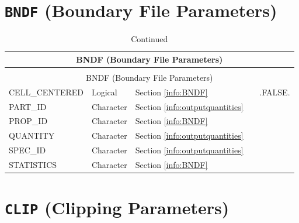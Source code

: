 \documentclass[11pt]{book}
\begin{document}
\clearpage


\section{\texorpdfstring{{\tt BNDF}}{BNDF} (Boundary File Parameters)}

\begin{longtable}{@{\extracolsep{\fill}}|l|l|l|l|l|}
\caption[Boundary file parameters ({\ct BNDF} namelist group)]{For more information see Section~\ref{info:BNDF}.}
\label{tbl:BNDF} \\
\hline
\multicolumn{5}{|c|}{{\ct BNDF} (Boundary File Parameters)} \\
\hline \hline
\endfirsthead
\caption[]{Continued} \\
\hline
\multicolumn{5}{|c|}{{\ct BNDF} (Boundary File Parameters)} \\
\hline \hline
\endhead
{\ct CELL\_CENTERED}    & Logical     & Section \ref{info:BNDF}                 &           & {\ct .FALSE.}   \\ \hline
{\ct PART\_ID}          & Character   & Section \ref{info:outputquantities}     &           &                 \\ \hline
{\ct PROP\_ID}          & Character   & Section \ref{info:BNDF}                 &           &                 \\ \hline
{\ct QUANTITY}          & Character   & Section \ref{info:outputquantities}     &           &                 \\ \hline
{\ct SPEC\_ID}          & Character   & Section \ref{info:outputquantities}     &           &                 \\ \hline
{\ct STATISTICS}        & Character   & Section \ref{info:BNDF}                 &           &                 \\ \hline
\end{longtable}


\vspace{\baselineskip}

\section{\texorpdfstring{{\tt CLIP}}{CLIP} (Clipping Parameters)}
\end{document}
